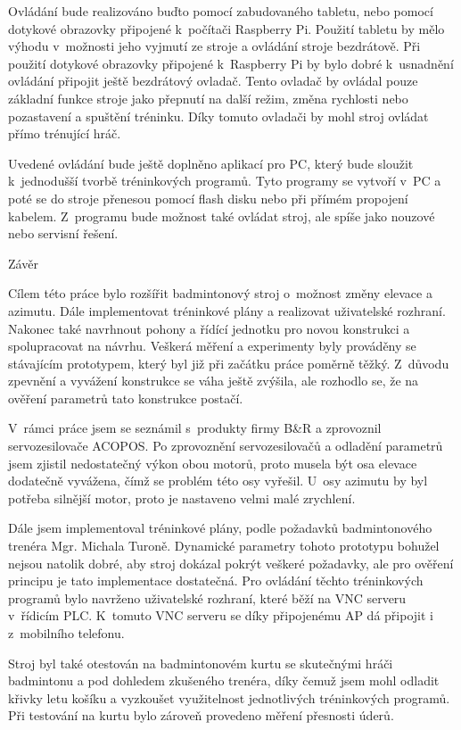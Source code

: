 Ovládání bude realizováno buďto pomocí zabudovaného tabletu, nebo pomocí dotykové obrazovky připojené k~počítači Raspberry Pi. Použití tabletu by mělo výhodu v~možnosti jeho vyjmutí ze stroje a ovládání stroje bezdrátově. Při použití dotykové obrazovky připojené k~Raspberry Pi by bylo dobré k~usnadnění ovládání připojit ještě bezdrátový ovladač. Tento ovladač by ovládal pouze základní funkce stroje jako přepnutí na další režim, změna rychlosti nebo pozastavení a spuštění tréninku. Díky tomuto ovladači by mohl stroj ovládat přímo trénující hráč.

Uvedené ovládání bude ještě doplněno aplikací pro PC, který bude sloužit k~jednodušší tvorbě tréninkových programů. Tyto programy se vytvoří v~PC a poté se do stroje přenesou pomocí flash disku nebo při přímém propojení kabelem. Z~programu bude možnost také ovládat stroj, ale spíše jako nouzové nebo servisní řešení.


\chap Závěr

Cílem této práce bylo rozšířit badmintonový stroj o~možnost změny elevace a azimutu. Dále implementovat tréninkové plány a realizovat uživatelské rozhraní. Nakonec také navrhnout pohony a řídící jednotku pro novou konstrukci a spolupracovat na návrhu. Veškerá měření a experimenty byly prováděny se stávajícím prototypem, který byl již při začátku práce poměrně těžký. Z~důvodu zpevnění a vyvážení konstrukce se váha ještě zvýšila, ale rozhodlo se, že na ověření parametrů tato konstrukce postačí.

V~rámci práce jsem se seznámil s~produkty firmy B\&R a zprovoznil servozesilovače ACOPOS. Po zprovoznění servozesilovačů a odladění parametrů jsem zjistil nedostatečný výkon obou motorů, proto musela být osa elevace dodatečně vyvážena, čímž se problém této osy vyřešil. U~osy azimutu by byl potřeba silnější motor, proto je nastaveno velmi malé zrychlení. 

Dále jsem implementoval tréninkové plány, podle požadavků badmintonového trenéra Mgr. Michala Turoně. Dynamické parametry tohoto prototypu bohužel nejsou natolik dobré, aby stroj dokázal pokrýt veškeré požadavky, ale pro ověření principu je tato implementace dostatečná. Pro ovládání těchto tréninkových programů bylo navrženo uživatelské rozhraní, které běží na VNC serveru v~řídicím PLC. K~tomuto VNC serveru se díky připojenému AP dá připojit i z~mobilního telefonu. 

Stroj byl také otestován na badmintonovém kurtu se skutečnými hráči badmintonu a pod dohledem zkušeného trenéra, díky čemuž jsem mohl odladit křivky letu košíku a vyzkoušet využitelnost jednotlivých tréninkových programů. Při testování na kurtu bylo zároveň provedeno měření přesnosti úderů.

